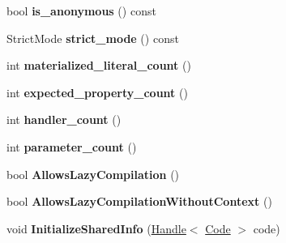 \begin{DoxyCompactItemize}
\item 
\hypertarget{classv8_1_1internal_1_1_v8___f_i_n_a_l_a8247b8fa211de126501a109fec51bd77}{}bool {\bfseries is\+\_\+anonymous} () const \label{classv8_1_1internal_1_1_v8___f_i_n_a_l_a8247b8fa211de126501a109fec51bd77}

\item 
\hypertarget{classv8_1_1internal_1_1_v8___f_i_n_a_l_a2aedf779fef90f5fec7b463341d87c42}{}Strict\+Mode {\bfseries strict\+\_\+mode} () const \label{classv8_1_1internal_1_1_v8___f_i_n_a_l_a2aedf779fef90f5fec7b463341d87c42}

\item 
\hypertarget{classv8_1_1internal_1_1_v8___f_i_n_a_l_ab86a28774ddd24f598ce070e6d2b8721}{}int {\bfseries materialized\+\_\+literal\+\_\+count} ()\label{classv8_1_1internal_1_1_v8___f_i_n_a_l_ab86a28774ddd24f598ce070e6d2b8721}

\item 
\hypertarget{classv8_1_1internal_1_1_v8___f_i_n_a_l_ada28d006a9ff19908be73387f0fab69d}{}int {\bfseries expected\+\_\+property\+\_\+count} ()\label{classv8_1_1internal_1_1_v8___f_i_n_a_l_ada28d006a9ff19908be73387f0fab69d}

\item 
\hypertarget{classv8_1_1internal_1_1_v8___f_i_n_a_l_a1e5736df2537c88df2602797c6c5cf26}{}int {\bfseries handler\+\_\+count} ()\label{classv8_1_1internal_1_1_v8___f_i_n_a_l_a1e5736df2537c88df2602797c6c5cf26}

\item 
\hypertarget{classv8_1_1internal_1_1_v8___f_i_n_a_l_a72f29ca415e4ff2951e2b9f4a02ab5fa}{}int {\bfseries parameter\+\_\+count} ()\label{classv8_1_1internal_1_1_v8___f_i_n_a_l_a72f29ca415e4ff2951e2b9f4a02ab5fa}

\item 
\hypertarget{classv8_1_1internal_1_1_v8___f_i_n_a_l_ac6b6920376665b9b860203e09e012182}{}bool {\bfseries Allows\+Lazy\+Compilation} ()\label{classv8_1_1internal_1_1_v8___f_i_n_a_l_ac6b6920376665b9b860203e09e012182}

\item 
\hypertarget{classv8_1_1internal_1_1_v8___f_i_n_a_l_ab82d9ec78d80d8ba273f69db826ea0ae}{}bool {\bfseries Allows\+Lazy\+Compilation\+Without\+Context} ()\label{classv8_1_1internal_1_1_v8___f_i_n_a_l_ab82d9ec78d80d8ba273f69db826ea0ae}

\item 
\hypertarget{classv8_1_1internal_1_1_v8___f_i_n_a_l_a2d0af8e350e24d18fc488b9262782baf}{}void {\bfseries Initialize\+Shared\+Info} (\hyperlink{classv8_1_1internal_1_1_handle}{Handle}$<$ \hyperlink{classv8_1_1internal_1_1_code}{Code} $>$ code)\label{classv8_1_1internal_1_1_v8___f_i_n_a_l_a2d0af8e350e24d18fc488b9262782baf}


\end{DoxyCompactItemize}

